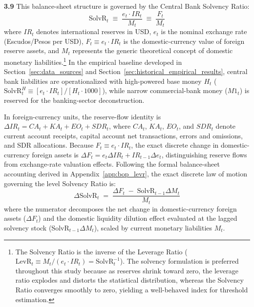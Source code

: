 \textbf{3.9} This balance-sheet structure is governed by the Central Bank Solvency Ratio:
\begin{equation}
	\text{SolvR}_t \;\equiv\; \frac{e_t \cdot IR_t}{M_t} \;\equiv\; \frac{F_t}{M_t}
	\label{eq:solvency_ratio}
\end{equation}
where $IR_t$ denotes international reserves in USD, $e_t$ is the nominal exchange rate (Escudos/Pesos per USD), $F_t \equiv e_t \cdot IR_t$ is the domestic-currency value of foreign reserve assets, and $M_t$ represents the generic theoretical concept of domestic monetary liabilities.\footnote{The Solvency Ratio is the inverse of the Leverage Ratio ($\text{LevR}_t \equiv M_t / (e_t \cdot IR_t) = \text{SolvR}_t^{-1}$). The solvency formulation is preferred throughout this study because as reserves shrink toward zero, the leverage ratio explodes and distorts the statistical distribution, whereas the Solvency Ratio converges smoothly to zero, yielding a well-behaved index for threshold estimation.} In the empirical baseline developed in Section~\ref{sec:data_sources} and Section~\ref{sec:historical_empirical_results}, central bank liabilities are operationalized with high-powered base money $H_t$ ($\text{SolvR}^H_t \equiv [e_t \cdot IR_t] / [H_t \cdot 1000]$), while narrow commercial-bank money ($M1_t$) is reserved for the banking-sector deconstruction.

In foreign-currency units, the reserve-flow identity is $\Delta IR_t = CA_t + KA_t + EO_t + SDR_t$, where $CA_t$, $KA_t$, $EO_t$, and $SDR_t$ denote current account receipts, capital account net transactions, errors and omissions, and SDR allocations. Because $F_t \equiv e_t \cdot IR_t$, the exact discrete change in domestic-currency foreign assets is $\Delta F_t = e_t \Delta IR_t + IR_{t-1} \Delta e_t$, distinguishing reserve flows from exchange-rate valuation effects. Following the formal balance-sheet accounting derived in Appendix~\ref{app:bop_levr}, the exact discrete law of motion governing the level Solvency Ratio is:
\begin{equation}
	\Delta \text{SolvR}_t \;=\; \frac{\Delta F_t \;-\; \text{SolvR}_{t-1} \Delta M_t}{M_t}
	\label{eq:solvency_law_motion}
\end{equation}
where the numerator decomposes the net change in domestic-currency foreign assets ($\Delta F_t$) and the domestic liquidity dilution effect evaluated at the lagged solvency stock ($\text{SolvR}_{t-1} \Delta M_t$), scaled by current monetary liabilities $M_t$.

